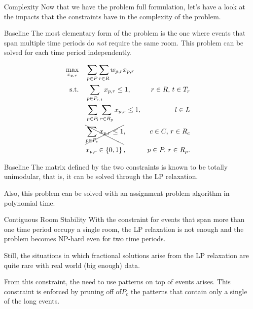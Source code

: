 \documentclass{beamer}
\begin{document}
\begin{frame}{Complexity}
    Now that we have the problem full formulation, let's have a look at the impacts that the constraints have in the complexity of the problem.
\end{frame}

\begin{frame}{Baseline}
    The most elementary form of the problem is the one where events that span multiple time periods do \emph{not} require the same room. This problem can be solved for each time period independently.

    \begin{align*}
        \max_{x_{p,r}} \quad & \sum_{p \in P} \sum_{r\in R} w_{p,r}x_{p,r} \\
	\textrm{s.t.} \quad & \sum_{p \in P_{r,t}} x_{p,r} \le 1, & r\in R,\,t\in T_r \\
			    & \sum_{p \in P_l} \sum_{r \in R_p} x_{p,r} \le 1, & l \in L \\
			    & \xcancel{\sum_{p \in P_c} x_{p,r} \le 1}, & c \in C,\, r \in R_c \\
			    & x_{p,r} \in \left\{ 0,1 \right\}, & p \in P,\, r\in R_p
    .\end{align*}
\end{frame}

\begin{frame}{Baseline}
    The matrix defined by the two constraints is known to be totally unimodular, that is, it can be solved through the LP relaxation. \linebreak

    Also, this problem can be solved with an assignment problem algorithm in polynomial time.
\end{frame}

\begin{frame}{Contiguous Room Stability}
    With the constraint for events that span more than one time period occupy a single room, the LP relaxation is not enough and the problem becomes NP-hard even for two time periods. \linebreak

    Still, the situations in which fractional solutions arise from the LP relaxation are quite rare with real world (big enough) data. \linebreak

    From this constraint, the need to use patterns on top of events arises. This constraint is enforced by pruning off of$P_c$ the patterns that contain only a single of the long events.
\end{frame}
\end{document}
